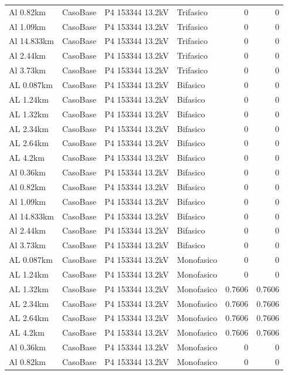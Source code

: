 \documentclass[11pt,a4paper]{article}
\begin{document}
\begin{longtable}{llllrr}
Al 0.82km & CasoBase & P4 153344 13.2kV & Trifasico & 0 & 0 \\
Al 1.09km & CasoBase & P4 153344 13.2kV & Trifasico & 0 & 0 \\
Al 14.833km & CasoBase & P4 153344 13.2kV & Trifasico & 0 & 0 \\
Al 2.44km & CasoBase & P4 153344 13.2kV & Trifasico & 0 & 0 \\
Al 3.73km & CasoBase & P4 153344 13.2kV & Trifasico & 0 & 0 \\
AL 0.087km & CasoBase & P4 153344 13.2kV & Bifasico & 0 & 0 \\
AL 1.24km & CasoBase & P4 153344 13.2kV & Bifasico & 0 & 0 \\
AL 1.32km & CasoBase & P4 153344 13.2kV & Bifasico & 0 & 0 \\
AL 2.34km & CasoBase & P4 153344 13.2kV & Bifasico & 0 & 0 \\
AL 2.64km & CasoBase & P4 153344 13.2kV & Bifasico & 0 & 0 \\
AL 4.2km & CasoBase & P4 153344 13.2kV & Bifasico & 0 & 0 \\
Al 0.36km & CasoBase & P4 153344 13.2kV & Bifasico & 0 & 0 \\
Al 0.82km & CasoBase & P4 153344 13.2kV & Bifasico & 0 & 0 \\
Al 1.09km & CasoBase & P4 153344 13.2kV & Bifasico & 0 & 0 \\
Al 14.833km & CasoBase & P4 153344 13.2kV & Bifasico & 0 & 0 \\
Al 2.44km & CasoBase & P4 153344 13.2kV & Bifasico & 0 & 0 \\
Al 3.73km & CasoBase & P4 153344 13.2kV & Bifasico & 0 & 0 \\
AL 0.087km & CasoBase & P4 153344 13.2kV & Monofasico & 0 & 0 \\
AL 1.24km & CasoBase & P4 153344 13.2kV & Monofasico & 0 & 0 \\
AL 1.32km & CasoBase & P4 153344 13.2kV & Monofasico & 0.7606 & 0.7606 \\
AL 2.34km & CasoBase & P4 153344 13.2kV & Monofasico & 0.7606 & 0.7606 \\
AL 2.64km & CasoBase & P4 153344 13.2kV & Monofasico & 0.7606 & 0.7606 \\
AL 4.2km & CasoBase & P4 153344 13.2kV & Monofasico & 0.7606 & 0.7606 \\
Al 0.36km & CasoBase & P4 153344 13.2kV & Monofasico & 0 & 0 \\
Al 0.82km & CasoBase & P4 153344 13.2kV & Monofasico & 0 & 0 \\

\end{longtable}
\end{document}
